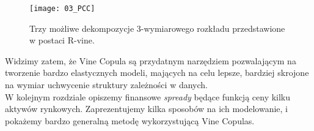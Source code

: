 \begin{figure}[h]
	\centering
	\texttt{[image: 03\_PCC]}
	
	\caption{Trzy możliwe dekompozycje 3-wymiarowego rozkładu przedstawione w postaci R-vine. \label{fig:PCCs}}
\end{figure}

Widzimy zatem, że Vine Copula są przydatnym narzędziem pozwalającym na tworzenie bardzo elastycznych modeli, mających na celu lepsze, bardziej skrojone na wymiar uchwycenie struktury zależności w danych.\\
W kolejnym rozdziale opiszemy finansowe \emph{spready} będące funkcją ceny kilku aktywów rynkowych. Zaprezentujemy kilka sposobów na ich modelowanie, i pokażemy bardzo generalną metodę wykorzystującą Vine Copulas.